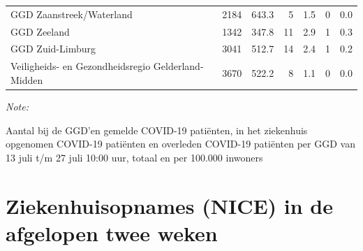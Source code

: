 \documentclass[
  english,
  man,floatsintext]{apa6}
\begin{document}
\begin{table}
\begin{threeparttable}
\begin{tabular}{lrrrrrr}
GGD Zaanstreek/Waterland & 2184 & 643.3 & 5 & 1.5 & 0 & 0.0\\
GGD Zeeland & 1342 & 347.8 & 11 & 2.9 & 1 & 0.3\\
GGD Zuid-Limburg & 3041 & 512.7 & 14 & 2.4 & 1 & 0.2\\
Veiligheids- en Gezondheidsregio Gelderland-Midden & 3670 & 522.2 & 8 & 1.1 & 0 & 0.0\\
\bottomrule
\end{tabular}
\begin{tablenotes}
\item \textit{Note: } 
\item Aantal bij de GGD’en gemelde COVID-19 patiënten, in het ziekenhuis opgenomen COVID-19 patiënten en overleden COVID-19 patiënten per GGD van 13 juli t/m 27 juli 10:00 uur, totaal en per 100.000 inwoners
\end{tablenotes}
\end{threeparttable}
\endgroup{}
\end{table}

\newpage

\hypertarget{ziekenhuisopnames-nice-in-de-afgelopen-twee-weken}{%
\section{Ziekenhuisopnames (NICE) in de afgelopen twee weken}\label{ziekenhuisopnames-nice-in-de-afgelopen-twee-weken}}
\end{document}
